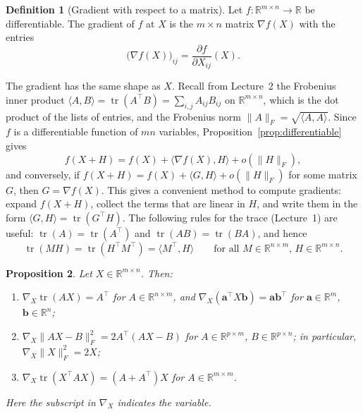 \documentclass[11pt]{article}
\newcommand{\norm}[1]{\lVert #1 \rVert}
\newcommand{\ip}[2]{\langle #1, #2 \rangle}
\theoremstyle{definition}
\newtheorem{definition}{Definition}[section]
\theoremstyle{plain}
\newtheorem{proposition}[definition]{Proposition}
\theoremstyle{remark}
\DeclareMathOperator{\tr}{tr}
\begin{document}
\begin{definition}[Gradient with respect to a matrix]\label{def:matrix-gradient}
    Let $f: \mathbb{R}^{m \times n} \to \mathbb{R}$ be differentiable. The gradient of $f$ at $X$ is the $m \times n$ matrix $\nabla f(X)$ with the entries
    \[\big(\nabla f(X)\big)_{ij} = \frac{\partial f}{\partial X_{ij}}(X).\]
\end{definition}

The gradient has the same shape as $X$. Recall from Lecture~2 the Frobenius inner product $\ip{A}{B} = \tr(A^\top B) = \sum_{i, j} A_{ij} B_{ij}$ on $\mathbb{R}^{m \times n}$, which is the dot product of the lists of entries, and the Frobenius norm $\norm{A}_F = \sqrt{\ip{A}{A}}$. Since $f$ is a differentiable function of $mn$ variables, Proposition~\ref{prop:differentiable} gives
\[f(X + H) = f(X) + \ip{\nabla f(X)}{H} + o(\norm{H}_F),\]
and conversely, if $f(X + H) = f(X) + \ip{G}{H} + o(\norm{H}_F)$ for some matrix $G$, then $G = \nabla f(X)$. This gives a convenient method to compute gradients: expand $f(X + H)$, collect the terms that are linear in $H$, and write them in the form $\ip{G}{H} = \tr(G^\top H)$. The following rules for the trace (Lecture~1) are useful: $\tr(A) = \tr(A^\top)$ and $\tr(AB) = \tr(BA)$, and hence
\[\tr(MH) = \tr(H^\top M^\top) = \ip{M^\top}{H} \qquad \text{for all } M \in \mathbb{R}^{n \times m}, \, H \in \mathbb{R}^{m \times n}.\]

\begin{proposition}\label{prop:matrix-gradients}
    Let $X \in \mathbb{R}^{m \times n}$. Then:
    \begin{enumerate}
        \item $\nabla_X \tr(AX) = A^\top$ for $A \in \mathbb{R}^{n \times m}$, and $\nabla_X (\mathbf{a}^\top X \mathbf{b}) = \mathbf{a}\mathbf{b}^\top$ for $\mathbf{a} \in \mathbb{R}^m$, $\mathbf{b} \in \mathbb{R}^n$;
        \item $\nabla_X \norm{AX - B}_F^2 = 2A^\top(AX - B)$ for $A \in \mathbb{R}^{p \times m}$, $B \in \mathbb{R}^{p \times n}$; in particular, $\nabla_X \norm{X}_F^2 = 2X$;
        \item $\nabla_X \tr(X^\top A X) = (A + A^\top)X$ for $A \in \mathbb{R}^{m \times m}$.
    \end{enumerate}
    Here the subscript in $\nabla_X$ indicates the variable.
\end{proposition}
\end{document}
